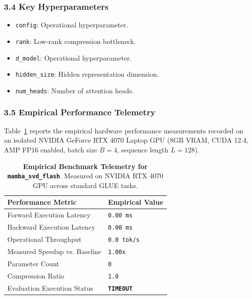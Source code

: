 \subsubsection*{3.4 Key Hyperparameters}
\begin{itemize}
    \item \texttt{config}: Operational hyperparameter.
    \item \texttt{rank}: Low-rank compression bottleneck.
    \item \texttt{d\_model}: Operational hyperparameter.
    \item \texttt{hidden\_size}: Hidden representation dimension.
    \item \texttt{num\_heads}: Number of attention heads.
\end{itemize}

\subsubsection*{3.5 Empirical Performance Telemetry}
Table~\ref{tab:telemetry_mamba_svd_flash} reports the empirical hardware performance measurements recorded on an isolated NVIDIA GeForce RTX 4070 Laptop GPU (8GB VRAM, CUDA 12.4, AMP FP16 enabled, batch size $B=4$, sequence length $L=128$).

\begin{table}[h]
\centering
\small
\caption{\textbf{Empirical Benchmark Telemetry for \texttt{mamba\_svd\_flash}}. Measured on NVIDIA RTX 4070 GPU across standard GLUE tasks.}
\label{tab:telemetry_mamba_svd_flash}
\begin{tabularx}{\columnwidth}{lX}
\toprule
\textbf{Performance Metric} & \textbf{Empirical Value} \\
\midrule
Forward Execution Latency & \texttt{0.00 ms} \\
Backward Execution Latency & \texttt{0.00 ms} \\
Operational Throughput & \texttt{0.0 tok/s} \\
Measured Speedup vs. Baseline & \texttt{1.00x} \\
Parameter Count & \texttt{0} \\
Compression Ratio & \texttt{1.0} \\
Evaluation Execution Status & \textbf{\texttt{TIMEOUT}} \\
\bottomrule
\end{tabularx}
\end{table}

